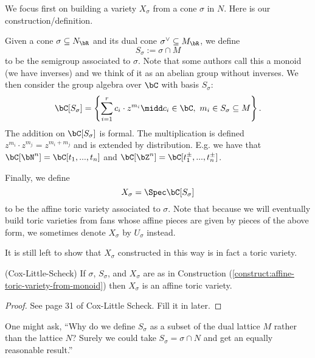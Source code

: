 We focus first on building a variety $X_\sigma$ from a cone $\sigma$ in $N$. Here is our construction/definition.
\begin{construct}\label{construct:affine-toric-variety-from-monoid}
	Given a cone $\sigma \subseteq N_\bR$ and its dual cone $\sigma^{\vee} \subseteq M_\bR$, we define
	\begin{equation}\label{eqn:semigroup-assoc-to-cone}
		S_\sigma := \sigma \cap M
	\end{equation}
	to be the semigroup associated to $\sigma$. Note that some authors call this a monoid (we have inverses) and we think of it as an abelian group without inverses. We then consider the group algebra over $\bC$ with basis $S_\sigma$:
	\begin{equation}\label{eqn:ring-assoc-to-cone}
		\bC[S_\sigma] = \left\{\sum_{i=1}^{r} c_i \cdot z^{m_i} \midd c_i \in \bC, ~m_i \in S_\sigma \subseteq M\right\}.
	\end{equation}
	The addition on $\bC[S_\sigma]$ is formal. The multiplication is defined $z^{m_i}\cdot z^{m_j} = z^{m_i + m_j}$ and is extended by distribution. E.g. we have that $\bC[\bN^n] = \bC[t_1,...,t_n]$ and $\bC[\bZ^n] = \bC[t_1^{\pm},...,t_n^{\pm}]$.

	Finally, we define
	\begin{equation}\label{eqn:affine-toric-variety}
	    X_\sigma = \Spec \bC[S_\sigma]
	\end{equation}
	to be the affine toric variety associated to $\sigma$. Note that because we will eventually build toric varieties from fans whose affine pieces are given by pieces of the above form, we sometimes denote $X_\sigma$ by $U_\sigma$ instead.
\end{construct}
It is still left to show that $X_\sigma$ constructed in this way is in fact a toric variety.

\begin{prop}(Cox-Little-Scheck)\label{prop:variety-assoc-to-cone-is-toric}
	If $\sigma$, $S_\sigma$, and $X_\sigma$ are as in Construction (\ref{construct:affine-toric-variety-from-monoid}) then $X_\sigma$ is an affine toric variety.
\end{prop}
\begin{proof}
	See page 31 of Cox-Little Scheck. Fill it in later.
\end{proof}
One might ask, ``Why do we define $S_\sigma$ as a subset of the dual lattice $M$ rather than the lattice $N$? Surely we could take $S_\sigma = \sigma \cap N$ and get an equally reasonable result.''

